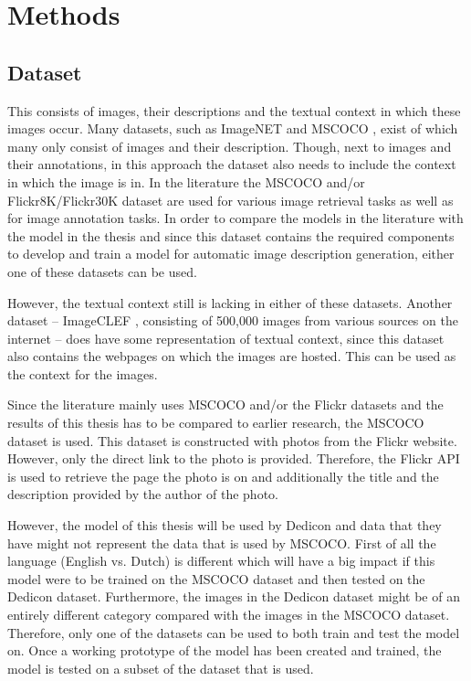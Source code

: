 \section{Methods}
\label{sec:methods}

\subsection{Dataset}
This consists of images, their descriptions and the textual context in which these images occur. Many datasets, such as ImageNET \cite{Russakovsky2012} and MSCOCO \cite{Lin2014}, exist of which many only consist of images and their description. Though, next to images and their annotations, in this approach the dataset also needs to include the context in which the image is in. In the literature the MSCOCO and/or Flickr8K/Flickr30K dataset are used for various image retrieval tasks as well as for image annotation tasks. In order to compare the models in the literature with the model in the thesis and since this dataset contains the required components to develop and train a model for automatic image description generation, either one of these datasets can be used. 

However, the textual context still is lacking in either of these datasets. Another dataset -- ImageCLEF \cite{Gilbert15_CLEF}, consisting of 500,000 images  from various sources on the internet -- does have some representation of textual context, since this dataset also contains the webpages on which the images are hosted. This can be used as the context for the images.

Since the literature mainly uses MSCOCO and/or the Flickr datasets and the results of this thesis has to be compared to earlier research, the MSCOCO dataset is used. This dataset is constructed with photos from the Flickr website. However, only the direct link to the photo is provided. Therefore, the Flickr API is used to retrieve the page the photo is on and additionally the title and the description provided by the author of the photo. 

However, the model of this thesis will be used by Dedicon and data that they have might not represent the data that is used by MSCOCO. First of all the language (English vs. Dutch) is different which will have a big impact if this model were to be trained on the MSCOCO dataset and then tested on the Dedicon dataset. Furthermore, the images in the Dedicon dataset might be of an entirely different category compared with the images in the MSCOCO dataset. Therefore, only one of the datasets can be used to both train and test the model on. Once a working prototype of the model has been created and trained, the model is tested on a subset of the dataset that is used. 

